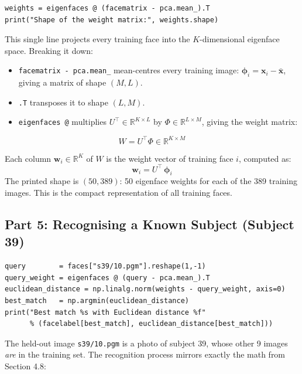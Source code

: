 \documentclass[12pt,a4paper]{article}
\begin{document}
\begin{lstlisting}
weights = eigenfaces @ (facematrix - pca.mean_).T
print("Shape of the weight matrix:", weights.shape)
\end{lstlisting}

This single line projects every training face into the $K$-dimensional
eigenface space. Breaking it down:

\begin{itemize}
    \item \texttt{facematrix - pca.mean\_} mean-centres every training image:
          $\boldsymbol{\phi}_i = \mathbf{x}_i - \bar{\mathbf{x}}$,
          giving a matrix of shape $(M, L)$.
    \item \texttt{.T} transposes it to shape $(L, M)$.
    \item \texttt{eigenfaces @} multiplies $U^\top \in \mathbb{R}^{K \times L}$
          by $\Phi \in \mathbb{R}^{L \times M}$, giving the weight matrix:
\end{itemize}

\[
W = U^\top \Phi \in \mathbb{R}^{K \times M}
\]

Each column $\mathbf{w}_i \in \mathbb{R}^K$ of $W$ is the weight vector
of training face $i$, computed as:
\[
\mathbf{w}_i = U^\top\,\boldsymbol{\phi}_i
\]
The printed shape is $(50, 389)$: 50 eigenface weights for each of the
389 training images. This is the compact representation of all training faces.

\subsection{Part 5: Recognising a Known Subject (Subject 39)}

\begin{lstlisting}
query        = faces["s39/10.pgm"].reshape(1,-1)
query_weight = eigenfaces @ (query - pca.mean_).T
euclidean_distance = np.linalg.norm(weights - query_weight, axis=0)
best_match   = np.argmin(euclidean_distance)
print("Best match %s with Euclidean distance %f"
      % (facelabel[best_match], euclidean_distance[best_match]))
\end{lstlisting}

The held-out image \texttt{s39/10.pgm} is a photo of subject 39, whose other
9 images \textit{are} in the training set. The recognition process mirrors
exactly the math from Section 4.8:
\end{document}

